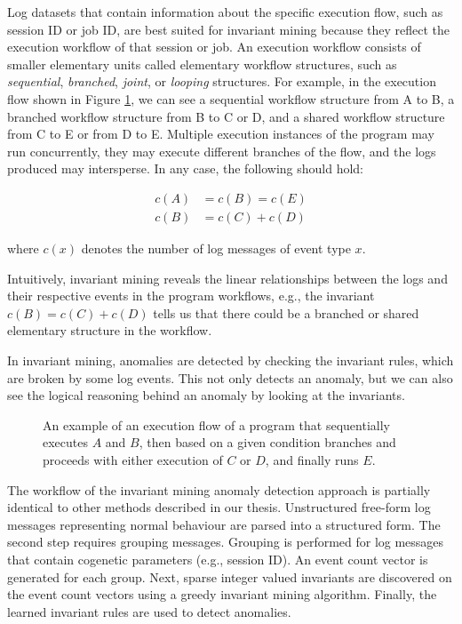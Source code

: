 Log datasets that contain information about the specific execution flow, such as session ID or job ID, are best suited for invariant mining because they reflect the execution workflow of that session or job. An execution workflow consists of smaller elementary units called elementary workflow structures, such as \textit{sequential}, \textit{branched}, \textit{joint}, or \textit{looping} structures. For example, in the execution flow shown in Figure \ref{figure:invariantMiningExecutionFlow}, we can see a sequential workflow structure from A to B, a branched workflow structure from B to C or D, and a shared workflow structure from C to E or from D to E. Multiple execution instances of the program may run concurrently, they may execute different branches of the flow, and the logs produced may intersperse. In any case, the following should hold:

\begin{align}
    c(A) &= c(B) = c(E) \\
    c(B) &= c(C) + c(D)
\end{align}

where $c(x)$ denotes the number of log messages of event type $x$. 

Intuitively, invariant mining reveals the linear relationships between the logs and their respective events in the program workflows, e.g., the invariant $c(B) = c(C) + c(D)$ tells us that there could be a branched or shared elementary structure in the workflow. 

In invariant mining, anomalies are detected by checking the invariant rules, which are broken by some log events. This not only detects an anomaly, but we can also see the logical reasoning behind an anomaly by looking at the invariants.

\begin{figure}\centering
	
	\caption{An example of an execution flow of a program that sequentially executes $A$ and $B$, then based on a given condition branches and proceeds with either execution of $C$ or $D$, and finally runs $E$.}
	\label{figure:invariantMiningExecutionFlow}
\end{figure}

The workflow of the invariant mining anomaly detection approach is partially identical to other methods described in our thesis. Unstructured free-form log messages representing normal behaviour are parsed into a structured form. The second step requires grouping messages. Grouping is performed for log messages that contain cogenetic parameters (e.g., session ID). An event count vector is generated for each group. Next, sparse integer valued invariants are discovered on the event count vectors using a greedy invariant mining algorithm. Finally, the learned invariant rules are used to detect anomalies.

